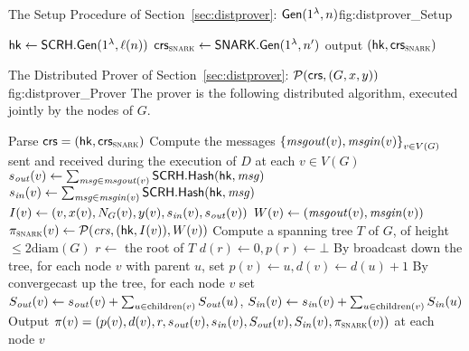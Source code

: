  \begin{subfigures}\label{fig:distprover}

	 \begin{nicefig}[h]{The Setup Procedure of Section~\ref{sec:distprover}: $\mathsf{Gen}(1^\lambda, n)$}{fig:distprover_Setup}
\begin{algorithmic}[1]
	\State $\mathsf{hk} \leftarrow \mathsf{SCRH}.\mathsf{Gen}(1^\lambda, \ell(n))$
	\State $\mathsf{crs}_\textsc{snark} \leftarrow \mathsf{SNARK}.\mathsf{Gen}(1^\lambda, n')$
	\State output $(\mathsf{hk}, \mathsf{crs}_\textsc{snark})$
\end{algorithmic}
\end{nicefig}

	 \begin{nicefig}[h]{The Distributed Prover of Section~\ref{sec:distprover}: $\mathcal{P}(\mathsf{crs}, (G, x, y))$}{fig:distprover_Prover}
		 The prover is the following distributed algorithm, executed jointly by the nodes of $G$.
\begin{algorithmic}[1]
	\State Parse $\mathsf{crs} = (\mathsf{hk}, \mathsf{crs}_\textsc{snark})$
	\State Compute the messages $\left \{{ \mathit{ msgout }(v), \mathit{ msgin }(v) } \right \}_{v \in V(G)}$ sent and received during
	the execution of $D$ at each $v \in V(G)$ 
	 
		\State $s_{\mathit{ out }}(v) \leftarrow \sum_{\mathit{ msg } \in \mathit{ msgout }(v) } \mathsf{SCRH}.\mathsf{Hash}(\mathsf{hk}, \mathit{ msg })$
		\State $s_{\mathit{ in }}(v) \leftarrow \sum_{\mathit{ msg } \in \mathit{ msgin }(v) } \mathsf{SCRH}.\mathsf{Hash}(\mathsf{hk}, \mathit{ msg })$
		\State $I(v) \leftarrow (v, x(v), N_G(v), y(v), s_{\mathit{ in }}(v), s_{\mathit{ out }}(v))$
		\State $W(v) \leftarrow ( \mathit{ msgout }(v), \mathit{ msgin }(v) )$
		\State $\pi_\textsc{snark}(v) \leftarrow \mathcal{P}(\mathit{ crs }, (\mathsf{hk}, I(v)), W(v))$
	\EndFor
	\State Compute a spanning tree $T$ of $G$, of height $\leq 2 \mathrm{diam}(G)$
	\State $r \leftarrow $ the root of $T$
	\State $d(r) \leftarrow 0, p(r) \leftarrow \bot$
	\State By broadcast down the tree, for each node $v$ with parent $u$,
		set $p(v) \leftarrow u, d(v) \leftarrow d(u) + 1$
	\State By convergecast up the tree, for each node $v$ set 
	$S_{\mathit{ out }}(v) \leftarrow s_{\mathit{ out }}(v) + \sum_{u \in \mathrm{children}(v)} S_{\mathit{ out }}(u)$,
	$S_{\mathit{ in }}(v) \leftarrow s_{\mathit{ in }}(v) + \sum_{u \in \mathrm{children}(v)} S_{\mathit{ in }}(u)$
	\State Output $\pi(v) = (p(v), d(v), r, s_{\mathit{ out }}(v), s_{\mathit{ in }}(v), S_{\mathit{ out }}(v), S_{\mathit{ in }}(v), \pi_\textsc{snark}(v))$
	at each node $v$
\end{algorithmic}
\end{nicefig}


\end{subfigures}
